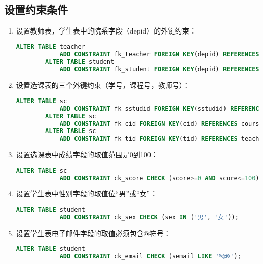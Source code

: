 \documentclass[a4paper]{uestcreport}
\begin{document}
\subsection{设置约束条件}
\begin{enumerate}
    \item 设置教师表，学生表中的院系字段（depid）的外键约束：\\
          \begin{lstlisting}[language=SQL]
        ALTER TABLE teacher
            ADD CONSTRAINT fk_teacher FOREIGN KEY(depid) REFERENCES dep(depid);
        ALTER TABLE student
            ADD CONSTRAINT fk_student FOREIGN KEY(depid) REFERENCES dep(depid);
    \end{lstlisting}
    \item 设置选课表的三个外键约束（学号，课程号，教师号）：\\
          \begin{lstlisting}[language=SQL]
        ALTER TABLE sc
            ADD CONSTRAINT fk_sstudid FOREIGN KEY(sstudid) REFERENCES student(studid);
        ALTER TABLE sc
            ADD CONSTRAINT fk_cid FOREIGN KEY(cid) REFERENCES course(cid);
        ALTER TABLE sc
            ADD CONSTRAINT fk_tid FOREIGN KEY(tid) REFERENCES teacher(tid);
    \end{lstlisting}
    \item 设置选课表中成绩字段的取值范围是0到100：\\
          \begin{lstlisting}[language=SQL]
        ALTER TABLE sc
            ADD CONSTRAINT ck_score CHECK (score>=0 AND score<=100);
    \end{lstlisting}
    \item 设置学生表中性别字段的取值位“男”或“女”：\\
          \begin{lstlisting}[language=SQL]
        ALTER TABLE student
            ADD CONSTRAINT ck_sex CHECK (sex IN ('男', '女'));
    \end{lstlisting}
    \item 设置学生表电子邮件字段的取值必须包含@符号：\\
          \begin{lstlisting}[language=SQL]
        ALTER TABLE student
            ADD CONSTRAINT ck_email CHECK (semail LIKE '%@%');
    \end{lstlisting}
\end{enumerate}
\end{document}

